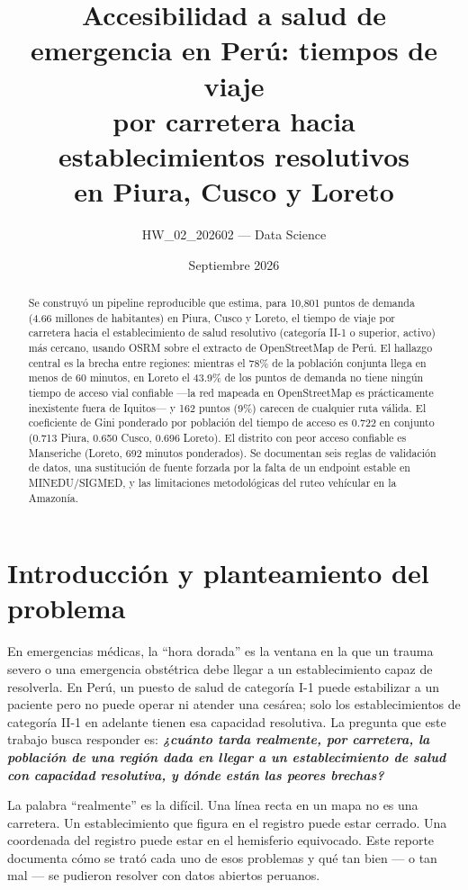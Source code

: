 \documentclass[11pt]{article}
\title{Accesibilidad a salud de emergencia en Per\'u: tiempos de viaje\\
por carretera hacia establecimientos resolutivos\\
\large en Piura, Cusco y Loreto}
\author{HW\_02\_202602 --- Data Science}
\date{Septiembre 2026}
\begin{document}
\maketitle

\begin{abstract}
\noindent
Se construy\'o un pipeline reproducible que estima, para 10{,}801 puntos de
demanda (4.66 millones de habitantes) en Piura, Cusco y Loreto, el tiempo de
viaje por carretera hacia el establecimiento de salud resolutivo
(categor\'ia II-1 o superior, activo) m\'as cercano, usando OSRM sobre el
extracto de OpenStreetMap de Per\'u. El hallazgo central es la brecha entre
regiones: mientras el 78\% de la poblaci\'on conjunta llega en menos de 60
minutos, en Loreto el 43.9\% de los puntos de demanda no tiene ning\'un
tiempo de acceso vial confiable ---la red mapeada en OpenStreetMap es
pr\'acticamente inexistente fuera de Iquitos--- y 162 puntos (9\%) carecen
de cualquier ruta v\'alida. El coeficiente de Gini ponderado por poblaci\'on
del tiempo de acceso es 0.722 en conjunto (0.713 Piura, 0.650 Cusco, 0.696
Loreto). El distrito con peor acceso confiable es Manseriche (Loreto, 692
minutos ponderados). Se documentan seis reglas de validaci\'on de datos, una
sustituci\'on de fuente forzada por la falta de un endpoint estable en
MINEDU/SIGMED, y las limitaciones metodol\'ogicas del ruteo veh\'icular en
la Amazon\'ia.
\end{abstract}

\section{Introducci\'on y planteamiento del problema}

En emergencias m\'edicas, la ``hora dorada'' es la ventana en la que un
trauma severo o una emergencia obst\'etrica debe llegar a un establecimiento
capaz de resolverla. En Per\'u, un puesto de salud de categor\'ia I-1 puede
estabilizar a un paciente pero no puede operar ni atender una ces\'area; solo
los establecimientos de categor\'ia II-1 en adelante tienen esa capacidad
resolutiva. La pregunta que este trabajo busca responder es: \emph{\textbf{
¿cu\'anto tarda realmente, por carretera, la poblaci\'on de una regi\'on dada
en llegar a un establecimiento de salud con capacidad resolutiva, y d\'onde
est\'an las peores brechas?}}

La palabra ``realmente'' es la dif\'icil. Una l\'inea recta en un mapa no es
una carretera. Un establecimiento que figura en el registro puede estar
cerrado. Una coordenada del registro puede estar en el hemisferio
equivocado. Este reporte documenta c\'omo se trat\'o cada uno de esos
problemas y qu\'e tan bien --- o tan mal --- se pudieron resolver con datos
abiertos peruanos.
\end{document}

